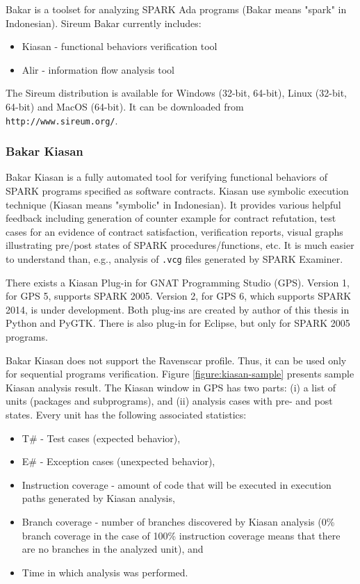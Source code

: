 Bakar is a toolset for analyzing SPARK Ada programs (Bakar means "spark" in Indonesian). Sireum Bakar currently includes:
\begin{itemize}
	\item Kiasan - functional behaviors verification tool
	\item Alir - information flow analysis tool	
\end{itemize}

The Sireum distribution is available for Windows (32-bit, 64-bit), Linux (32-bit, 64-bit) and MacOS (64-bit). It can be downloaded from \lstinline{http://www.sireum.org/}.


\subsubsection{Bakar Kiasan}

Bakar Kiasan \cite{Kiasan:Paper} is a fully automated tool for verifying functional behaviors of SPARK programs specified as software contracts. Kiasan use symbolic execution technique (Kiasan means "symbolic" in Indonesian). It provides various helpful feedback including generation of counter example for contract refutation, test cases for an evidence of contract satisfaction, verification reports, visual graphs illustrating pre/post states of SPARK procedures/functions, etc. It is much easier to understand than, e.g., analysis of \lstinline{.vcg} files generated by SPARK Examiner.

There exists a Kiasan Plug-in for GNAT Programming Studio (GPS). Version 1, for GPS 5, supports SPARK 2005. Version 2, for GPS 6, which supports SPARK 2014, is under development. Both plug-ins are created by author of this thesis in Python and PyGTK. There is also plug-in for Eclipse, but only for SPARK 2005 programs.

Bakar Kiasan does not support the Ravenscar profile. Thus, it can be used only for sequential programs verification. Figure \ref{figure:kiasan-sample} presents sample Kiasan analysis result. The Kiasan window in GPS has two parts: (i) a list of units (packages and subprograms), and (ii) analysis cases with pre- and post states. Every unit has the following associated statistics:
\begin{itemize}
	\item T\# - Test cases (expected behavior),
	\item E\# - Exception cases (unexpected behavior),
	\item Instruction coverage - amount of code that will be executed in execution paths generated by Kiasan analysis,
	\item Branch coverage - number of branches discovered by Kiasan analysis (0\% branch coverage in the case of 100\% instruction coverage means that there are no branches in the analyzed unit), and
	\item Time in which analysis was performed.
\end{itemize}

